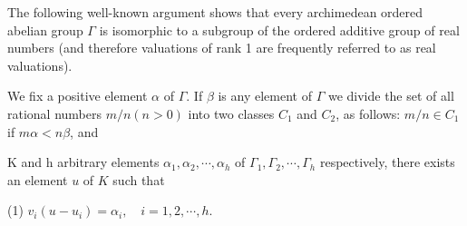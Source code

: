The following well-known argument shows that every archimedean ordered abelian group $\Gamma$ is isomorphic to a subgroup of the ordered additive group of real numbers (and therefore valuations of rank 1 are frequently referred to as real valuations).

We fix a positive element $\alpha$ of $\Gamma$. If $\beta$ is any element of $\Gamma$ we divide the set of all rational numbers $m/n (n > 0)$ into two classes $C_1$ and $C_2$, as follows: $m/n \in C_1$ if $m\alpha < n\beta$, and

K and h arbitrary elements $\alpha_1, \alpha_2, \cdots, \alpha_h$ of $\Gamma_1, \Gamma_2, \cdots, \Gamma_h$ respectively, there exists an element $u$ of $K$ such that

(1) $v_i(u - u_i) = \alpha_i, \quad i = 1, 2, \cdots, h.$